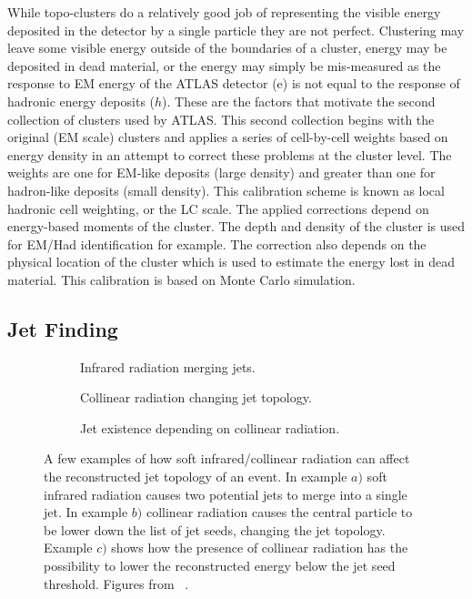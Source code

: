  
While topo-clusters do a relatively good job of representing the visible energy deposited in the detector by a single particle they are not perfect.  
Clustering may leave some visible energy outside of the boundaries of a cluster, energy may be deposited in dead material, or the energy may simply be mis-measured as the response to EM energy of the ATLAS detector (e) is not equal to the response of hadronic energy deposits ($h$).  
These are the factors that motivate the second collection of clusters used by ATLAS.  
This second collection begins with the original (EM scale) clusters and applies a series of cell-by-cell weights based on energy density in an attempt to correct these problems at the cluster level.  
The weights are one for EM-like deposits (large density) and greater than one for hadron-like deposits (small density).  
This calibration scheme is known as local hadronic cell weighting, or the LC scale.  
The applied corrections depend on energy-based moments of the cluster.  
The depth and density of the cluster is used for EM/Had identification for example.  
The correction also depends on the physical location of the cluster which is used to estimate the energy lost in dead material.  
This calibration is based on Monte Carlo simulation.   

\subsection{Jet Finding}
\label{Sec:JetFinding}
\begin{figure}[!ht]
 \centering
 \begin{subfigure}{.5\textwidth}
  \centering
  \caption{Infrared radiation merging jets.}
 \end{subfigure}%
 \begin{subfigure}{.5\textwidth}
  \centering
  \caption{Collinear radiation changing jet topology.}
 \end{subfigure}
 \begin{subfigure}{.5\textwidth}
  \centering
  \caption{Jet existence depending on collinear radiation.}
 \end{subfigure}
 \caption[Effect of radiation on jet building.]
  {A few examples of how soft infrared/collinear radiation can affect the reconstructed jet topology of an event.  In example $a)$ soft infrared radiation causes two potential jets to merge into a single jet.  In example $b)$ collinear radiation causes the central particle to be lower down the list of jet seeds, changing the jet topology.  Example $c)$ shows how the presence of collinear radiation has the possibility to lower the reconstructed energy below the jet seed threshold.  Figures from ~\cite{Blazey:2000qt}. }
 \label{Fig:IRCoSafety}
\end{figure}

